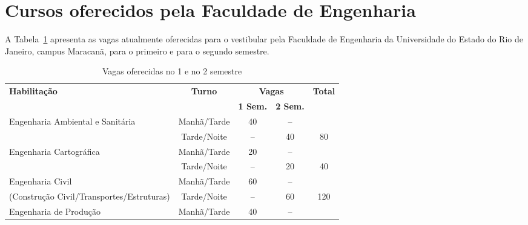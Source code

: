 \section{Cursos oferecidos pela Faculdade de Engenharia}

A Tabela~\ref{tabvagas} apresenta as vagas atualmente oferecidas para o vestibular pela Faculdade de Engenharia da Universidade do Estado do Rio de Janeiro, campus Maracanã, para o primeiro e para o segundo semestre.
\begin{table}
	\centering
	\caption{Vagas oferecidas no 1\textordmasculine{} e no 2\textordmasculine{} semestre}
	\label{tabvagas}
	\begin{tabularx}{\textwidth}{|X|c|c|c|c|}
		\hline
		\multirow{2}{*}{\textbf{Habilitação}}                 & \multirow{2}{*}{\textbf{Turno}} & \multicolumn{2}{c|}{\textbf{Vagas}} & \multirow{2}{*}{\textbf{Total}}          \\
		\cline{3-4}                                           &                                 & \textbf{1\textordmasculine{} Sem.}  & \textbf{2\textordmasculine{} Sem.} &     \\
		\hline
		Engenharia Ambiental e Sanitária                      & Manhã/Tarde                     & 40                                  & --                                 &     \\
		                                                      & Tarde/Noite                     & --                                  & 40                                 & 80  \\
		\hline
		Engenharia Cartográfica                               & Manhã/Tarde                     & 20                                  & --                                 &     \\
		                                                      & Tarde/Noite                     & --                                  & 20                                 & 40  \\
		\hline
		Engenharia Civil                                      & Manhã/Tarde                     & 60                                  & --                                 &     \\
		(Construção Civil/Transportes/Estruturas)             & Tarde/Noite                     & --                                  & 60                                 & 120 \\
		\hline
		Engenharia de Produção                                & Manhã/Tarde                     & 40                                  & --                                 &     \\

\end{tabularx}
\end{table}

